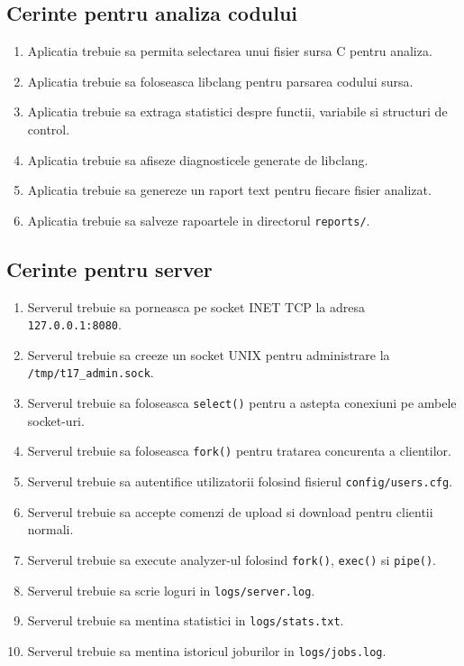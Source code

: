 \documentclass[12pt,a4paper]{article}
\begin{document}
\subsection{Cerinte pentru analiza codului}

\begin{enumerate}[label=CF\arabic*.]
    \item Aplicatia trebuie sa permita selectarea unui fisier sursa C pentru analiza.
    \item Aplicatia trebuie sa foloseasca libclang pentru parsarea codului sursa.
    \item Aplicatia trebuie sa extraga statistici despre functii, variabile si structuri de control.
    \item Aplicatia trebuie sa afiseze diagnosticele generate de libclang.
    \item Aplicatia trebuie sa genereze un raport text pentru fiecare fisier analizat.
    \item Aplicatia trebuie sa salveze rapoartele in directorul \texttt{reports/}.
\end{enumerate}

\subsection{Cerinte pentru server}

\begin{enumerate}[label=CF\arabic*., resume]
    \item Serverul trebuie sa porneasca pe socket INET TCP la adresa \texttt{127.0.0.1:8080}.
    \item Serverul trebuie sa creeze un socket UNIX pentru administrare la \texttt{/tmp/t17\_admin.sock}.
    \item Serverul trebuie sa foloseasca \texttt{select()} pentru a astepta conexiuni pe ambele socket-uri.
    \item Serverul trebuie sa foloseasca \texttt{fork()} pentru tratarea concurenta a clientilor.
    \item Serverul trebuie sa autentifice utilizatorii folosind fisierul \texttt{config/users.cfg}.
    \item Serverul trebuie sa accepte comenzi de upload si download pentru clientii normali.
    \item Serverul trebuie sa execute analyzer-ul folosind \texttt{fork()}, \texttt{exec()} si \texttt{pipe()}.
    \item Serverul trebuie sa scrie loguri in \texttt{logs/server.log}.
    \item Serverul trebuie sa mentina statistici in \texttt{logs/stats.txt}.
    \item Serverul trebuie sa mentina istoricul joburilor in \texttt{logs/jobs.log}.
\end{enumerate}
\end{document}
